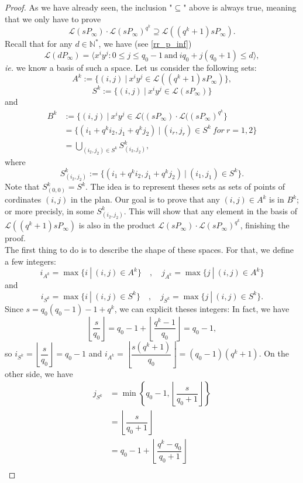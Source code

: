 \documentclass[a4paper]{article}
\newcommand{\calL}{\mathcal{L}}
\begin{document}
\begin{proof}
As we have already seen, the inclusion "$\subseteq$" above is always true, meaning that we only have to prove 
\[\calL(sP_{\infty}) \cdot \calL(sP_{\infty})^{q^k} \supseteq \calL((q^k+1)sP_{\infty}).\]
Recall that for any $d \in \mathbb{N}^*$, we have (see \eqref{rr_p_inf})
\[\calL(dP_{\infty}) = \langle x^iy^j : 0 \leq j \leq q_0-1 \ \mathrm{and} \ iq_0+j(q_0+1) \leq d \rangle, \]
\emph{ie.} we know a basis of such a space. Let us consider the following sets:
\[A^k := \{(i,j) \ | \ x^iy^j \in \calL((q^k+1)sP_{\infty})\},\]
\[S^k := \{(i,j) \ | \ x^iy^j \in \calL(sP_{\infty})\}\]
and
\begin{align*}
B^k &:= \{(i,j) \ | \ x^iy^j \in \calL((sP_{\infty}) \cdot \calL((sP_{\infty})^{q^k} \} \\
&= \{(i_1+q^ki_2,j_1+q^kj_2) \ | \ (i_r,j_r) \in S^k \ for \ r=1,2\} \\
&= \bigcup_{(i_2,j_2)\in S^k} S^k_{(i_2,j_2)},
\end{align*}
where 
\[ S^k_{(i_2,j_2)} := \{(i_1+q^ki_2,j_1+q^kj_2) \ | \ (i_1,j_1) \in S^k\}.\]
Note that $S^k_{(0,0)}=S^k$. The idea is to represent theses sets as sets of points of cordinates $(i,j)$ in the plan. Our goal is to prove that any $(i,j) \in A^k$ is in $B^k$; or more precisly, in some $S^k_{(i_2,j_2)}$. This will show that any element in the basis of $\calL((q^k+1)sP_{\infty})$ is also in the product $\calL(sP_{\infty}) \cdot \calL(sP_{\infty})^{q^k}$, finishing the proof. \\
The first thing to do is to describe the shape of these spaces. For that, we define a few integers:
\[i_{A^k} = \max \{ i \ | \ (i,j) \in A^k\} \quad , \quad j_{A^k} = \max \{ j \ | \ (i,j) \in A^k\}\]
and
\[i_{S^k} = \max \{ i \ | \ (i,j) \in S^k\} \quad , \quad j_{S^k} = \max \{ j \ | \ (i,j) \in S^k\}.\]
Since $s=q_0(q_0-1)-1+q^k$, we can explicit theses integers: In fact, we have 
\[ \left\lfloor \dfrac{s}{q_0} \right\rfloor = q_0-1 + \left\lfloor \dfrac{q^k-1}{q_0}\right\rfloor = q_0-1,\]
so $i_{S^k} = \left\lfloor \dfrac{s}{q_0} \right\rfloor = q_0-1$ and $i_{A^k} = \left\lfloor \dfrac{s(q^k+1)}{q_0} \right\rfloor = (q_0-1)(q^k+1)$. On the other side, we have 
\begin{align*}
    j_{S^k} &= \min \left\{ q_0-1, \left\lfloor \dfrac{s}{q_0+1} \right\rfloor \right\} \\
            &=  \left\lfloor \dfrac{s}{q_0+1} \right\rfloor \\
            &= q_0-1 +  \left\lfloor \dfrac{q^k-q_0}{q_0+1} \right\rfloor \\

\end{align*}
\end{proof}
\end{document}
